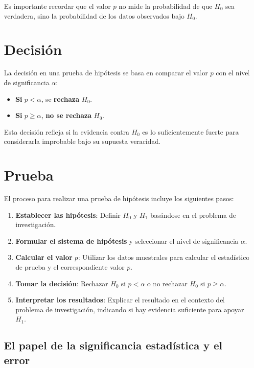 \documentclass[
  letterpaper,
  DIV=11,
  numbers=noendperiod]{scrreprt}
\providecommand{\tightlist}{%
  \setlength{\itemsep}{0pt}\setlength{\parskip}{0pt}}\usepackage{longtable,booktabs,array}
\begin{document}
Es importante recordar que el valor \(p\) no mide la probabilidad de que
\(H_0\) sea verdadera, sino la probabilidad de los datos observados bajo
\(H_0\).

\section{Decisión}\label{decisiuxf3n}

La decisión en una prueba de hipótesis se basa en comparar el valor
\(p\) con el nivel de significancia \(\alpha\):

\begin{itemize}
\tightlist
\item
  \textbf{Si} \(p < \alpha\), se \textbf{rechaza} \(H_0\).
\item
  \textbf{Si} \(p \geq \alpha\), \textbf{no se rechaza} \(H_0\).
\end{itemize}

Esta decisión refleja si la evidencia contra \(H_0\) es lo
suficientemente fuerte para considerarla improbable bajo su supuesta
veracidad.

\section{Prueba}\label{prueba}

El proceso para realizar una prueba de hipótesis incluye los siguientes
pasos:

\begin{enumerate}
\def\labelenumi{\arabic{enumi}.}
\tightlist
\item
  \textbf{Establecer las hipótesis}: Definir \(H_0\) y \(H_1\) basándose
  en el problema de investigación.
\item
  \textbf{Formular el sistema de hipótesis} y seleccionar el nivel de
  significancia \(\alpha\).
\item
  \textbf{Calcular el valor} \(p\): Utilizar los datos muestrales para
  calcular el estadístico de prueba y el correspondiente valor \(p\).
\item
  \textbf{Tomar la decisión}: Rechazar \(H_0\) si \(p < \alpha\) o no
  rechazar \(H_0\) si \(p \geq \alpha\).
\item
  \textbf{Interpretar los resultados}: Explicar el resultado en el
  contexto del problema de investigación, indicando si hay evidencia
  suficiente para apoyar \(H_1\).
\end{enumerate}

\subsection{El papel de la significancia estadística y el
error}\label{el-papel-de-la-significancia-estaduxedstica-y-el-error}
\end{document}
